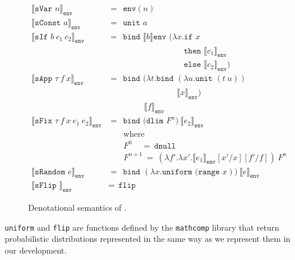 \documentclass[11pt, leqno, titlepage]{article}
\theoremstyle{definition}
\begin{document}
\begin{figure}[h]
  \begin{align*}
    \llbracket\texttt{sVar }n\rrbracket _{\texttt{env}}
      &=~~ \texttt{env}(n)\\ 
    \llbracket\texttt{sConst }a\rrbracket_{\texttt{env}}
      &=~~ \texttt{unit }a\\
    \llbracket\texttt{sIf }b~c_1~c_2\rrbracket_{\texttt{env}}
      &=~~ \texttt{bind }\llbracket b\rrbracket\texttt{env }(\lambda x.\texttt{if $x$}\\ 
      & \hspace{110pt}\texttt{then } \llbracket c_1\rrbracket_{\texttt{env}} \\
      & \hspace{110pt}\texttt{else } \llbracket c_2
        \rrbracket_{\texttt{env}})\\
    \llbracket\texttt{sApp }\tau~f~x\rrbracket_{\texttt{env}}
      &=~~ \texttt{bind }(\lambda t. \texttt{bind }(\lambda u. \texttt{unit }(t~u))\\
      & \hspace{100pt} \llbracket x \rrbracket_{\texttt{env}})\\
      & \hspace{52pt}\llbracket f \rrbracket_{\texttt{env}}\\ 
    \llbracket\texttt{sFix }\tau~f~x~e_1~e_2\rrbracket_{\texttt{env}}
      &=~~ \texttt{bind $($dlim }F^n)~ \llbracket e_2 \rrbracket _{\texttt{env}}\\
      & \hspace{22pt} \text{where}\\
      & \hspace{22pt}F^0 \hspace{11pt} ~=~ \texttt{dnull}\\
      & \hspace{22pt}F^{n+1} ~=~  (\lambda f'.\lambda x'. \llbracket e_1 \rrbracket
        _{\texttt{env}}[x'/x][f'/f])~F^n\\
    \llbracket\texttt{sRandom } e\rrbracket_{\texttt{env}}
      &=~~\texttt{bind }(\lambda x.\texttt{uniform $($range } x))
        ~\llbracket e \rrbracket _{\texttt{env}}\\
    \llbracket\texttt{sFlip }\rrbracket_{\texttt{env}}
      &=~~ \texttt{flip}
  \end{align*}
  \caption{Denotational semantics of \srml.}
  \label{fig:srml-sem}
\end{figure}

\texttt{uniform} and \texttt{flip} are functions defined by the \texttt{mathcomp}
library that return probabilistic distributions represented in the same way as we
represent them in our development.
\end{document}
